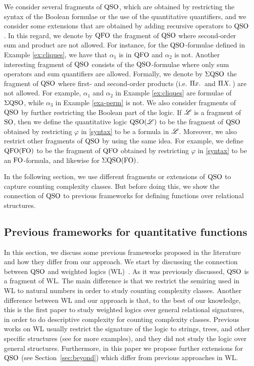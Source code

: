 We consider several fragments of ${\rm QSO}$, which are obtained by restricting the syntax of the Boolean formulae or the use of the quantitative quantifiers, and we consider some extensions that are obtained by adding recursive operators to ${\rm QSO}$.
In this regard, we denote by ${\rm QFO}$ the fragment of ${\rm QSO}$ where second-order sum and product are not allowed. 
For instance, for the ${\rm QSO}$-formulae defined in Example \ref{ex:cliques}, we have that $\alpha_1$ is in ${\rm QFO}$ and $\alpha_2$ is not.
Another interesting fragment of ${\rm QSO}$ consists of the ${\rm QSO}$-formulae where only sum operators and sum quantifiers are allowed. 
Formally, we denote by $\Sigma{\rm QSO}$ the fragment of ${\rm QSO}$ where first- and second-order products (i.e. $\Pi{x}.\,$ and $\Pi{X}.\,$) are not allowed.
For example, $\alpha_1$ and $\alpha_2$ in Example \ref{ex:cliques} are formulae of $\Sigma{\rm QSO}$, while $\alpha_3$ in Example \ref{exa-perm} is not. 
We also consider fragments of ${\rm QSO}$ by further restricting the Boolean part of the logic.
If $\mathscr{L}$ is a fragment of ${\rm SO}$, then we define the quantitative logic ${\rm QSO}(\mathscr{L})$ to be the fragment of ${\rm QSO}$ obtained by restricting $\varphi$ in \eqref{syntax} to be a formula in $\mathscr{L}$. Moreover, we also restrict other fragments of ${\rm QSO}$ by using the same idea. 
For example, we define ${\rm QFO}({\rm FO})$ to be the fragment of ${\rm QFO}$ obtained by restricting $\varphi$ in \eqref{syntax} to be an ${\rm FO}$-formula, and likewise for $\Sigma{\rm QSO}({\rm FO})$.

In the following section, we use different fragments or extensions of ${\rm QSO}$ to capture counting complexity classes. But before doing this, we show the connection of ${\rm QSO}$ to previous frameworks for defining functions over relational structures.

\subsection{Previous frameworks for quantitative functions} \label{sec:previous}

In this section, we discuss some previous frameworks proposed in the literature and how they differ from our approach.
We start by discussing the connection between ${\rm QSO}$ and weighted logics (WL)~\cite{DrosteG07}. 
As it was previously discussed, ${\rm QSO}$ is a fragment of WL.
The main difference is that we restrict the semiring used in WL to natural numbers in order to study counting complexity classes.
Another difference between WL and our approach is that, to the best of our knowledge, this is the first paper to study weighted logics over general relational signatures, in order  to do descriptive complexity for counting complexity classes. 
Previous works on WL usually restrict the signature of the logic to strings, trees, and other specific structures (see \cite{droste2009handbook} for more examples), and they did not study the logic over general structures. 
Furthermore, in this paper we propose further extensions for ${\rm QSO}$ (see Section~\ref{sec:beyond}) which differ from previous approaches in WL.


